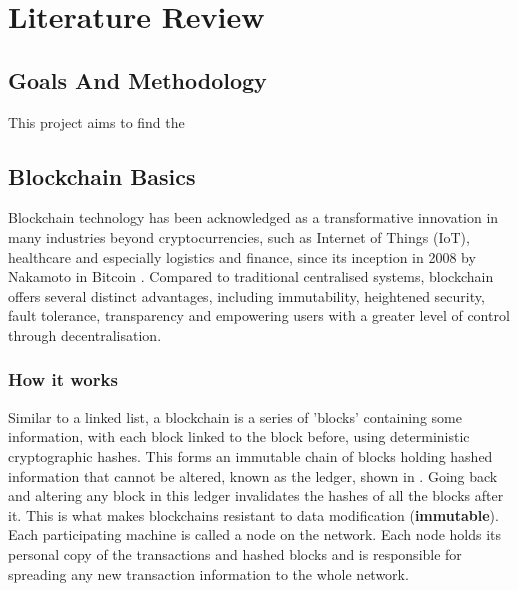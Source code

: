 \chapter{Literature Review}

\section{Goals And Methodology}
This project aims to find the


\section{Blockchain Basics}

Blockchain technology has been acknowledged as a transformative innovation in many industries beyond cryptocurrencies, such as Internet of Things (IoT), healthcare and especially logistics and finance, since its inception in 2008 by Nakamoto in Bitcoin \cite{NakamotoBitcoin:System}. Compared to traditional centralised systems, blockchain offers several distinct advantages, including immutability, heightened security, fault tolerance, transparency and empowering users with a greater level of control through decentralisation.

\subsection{How it works}

Similar to a linked list, a blockchain is a series of 'blocks' containing some information, with each block linked to the block before, using deterministic cryptographic hashes. This forms an immutable chain of blocks holding hashed information that cannot be altered, known as the ledger, shown in . Going back and altering any block in this ledger invalidates the hashes of all the blocks after it. This is what makes blockchains resistant to data modification (\textbf{immutable}). Each participating machine is called a node on the network. Each node holds its personal copy of the transactions and hashed blocks and is responsible for spreading any new transaction information to the whole network.

